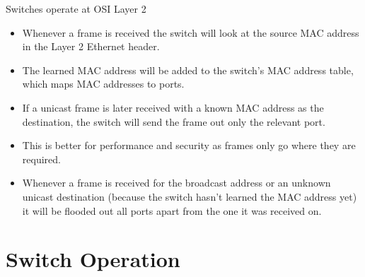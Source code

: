 \documentclass[pdflatex,compress,mathserif]{beamer}
\begin{document}
\begin{frame}{Switches operate at OSI Layer 2}
	\begin{itemize}
		\item Whenever a frame is received the switch will look at the source MAC address in the Layer 2 Ethernet header.
		\item The learned MAC address will be added to the switch’s MAC address table, which maps MAC addresses to ports.
		\item If a unicast frame is later received with a known MAC address as the destination, the switch will send the frame out only the relevant port.
		\item This is better for performance and security as frames only go where they are required.
		\item Whenever a frame is received for the broadcast address or an unknown unicast destination (because the switch hasn’t learned the MAC address yet) it will be flooded out all ports apart from the one it was received on.
	\end{itemize}
\end{frame}

\section{Switch Operation}
\end{document}
